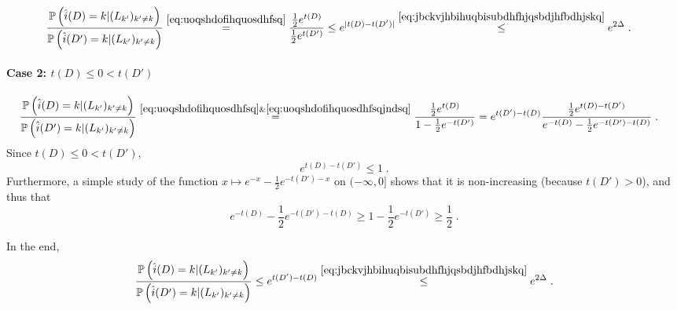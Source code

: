 \documentclass{article}
\theoremstyle{plain}
\theoremstyle{definition}
\theoremstyle{remark}
\newcommand{\Prob}[0]{\mathbb{P}}
\newcommand\p[1]{\left( {#1}\right)}
\begin{document}
\begin{equation}
    \begin{aligned}
        \frac{\Prob \p{\hat{i}(D) = k | (L_{k'})_{k' \neq k}}}{\Prob \p{\hat{i}(D') = k | (L_{k'})_{k' \neq k}}}
        &\stackrel{\eqref{eq:uoqshdofihquosdhfsq}}{=}
        \frac{\frac{1}{2} e^{t(D)}}{\frac{1}{2} e^{t(D')}}
        \leq e^{|t(D) - t(D')|}
        \stackrel{\eqref{eq:jbckvjhbihuqbisubdhfhjqsbdjhfbdhjskq}}{\leq} e^{2 \Delta} \;.
    \end{aligned}
\end{equation}

\paragraph{Case 2: $t(D)\leq 0 < t(D')$}

\begin{equation}
    \begin{aligned}
        \frac{\Prob \p{\hat{i}(D) = k | (L_{k'})_{k' \neq k}}}{\Prob \p{\hat{i}(D') = k | (L_{k'})_{k' \neq k}}}
        &\stackrel{\eqref{eq:uoqshdofihquosdhfsq} \& \eqref{eq:uoqshdofihquosdhfsqjndsq}}{=}
        \frac{\frac{1}{2} e^{t(D)}}{1 - \frac{1}{2} e^{-t(D')}}
        =
        e^{t(D') - t(D)} \frac{\frac{1}{2} e^{t(D)-t(D')}}{e^{-t(D)} - \frac{1}{2} e^{-t(D')-t(D)}} \;.
    \end{aligned}
\end{equation}
Since $t(D)\leq 0 < t(D')$, 
\begin{equation}
    e^{t(D)-t(D')} \leq 1 \;.
\end{equation}
Furthermore, a simple study of the function $x \mapsto e^{-x} - \frac{1}{2} e^{-t(D')-x}$ on $(-\infty, 0]$ shows that it is non-increasing (because $t(D') > 0$), and thus that 
\begin{equation}
    e^{-t(D)} - \frac{1}{2} e^{-t(D')-t(D)} \geq 1 - \frac{1}{2} e^{-t(D')} \geq \frac{1}{2} \;.
\end{equation}

In the end, 
\begin{equation}
    \begin{aligned}
        \frac{\Prob \p{\hat{i}(D) = k | (L_{k'})_{k' \neq k}}}{\Prob \p{\hat{i}(D') = k | (L_{k'})_{k' \neq k}}}
        \leq
        e^{t(D') - t(D)} 
        \stackrel{\eqref{eq:jbckvjhbihuqbisubdhfhjqsbdjhfbdhjskq}}{\leq} e^{2 \Delta}
        \;.
    \end{aligned}
\end{equation}
\end{document}
